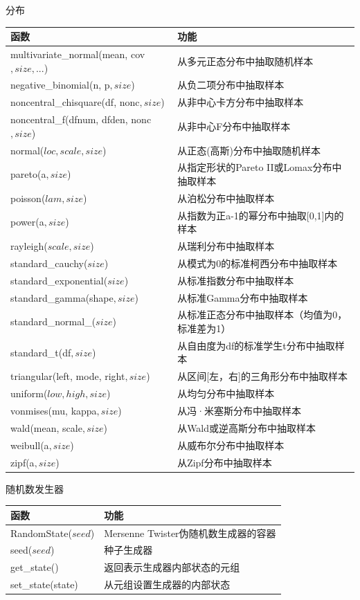 \documentclass[ignorenonframetext,11pt,xcolor=dvipsnames,hyperref={colorlinks,allcolors=.,urlcolor=blue, citecolor=violet, bookmarksdepth=4},aspectratio=1610]{beamer}
\begin{document}
\begin{frame}{分布}
\protect\hypertarget{section-38}{}

\scriptsize

\begin{longtable}[]{@{}ll@{}}
\toprule
函数 & 功能\tabularnewline
\midrule
\endhead
multivariate\_normal(mean, cov\(, size, ...\)) &
从多元正态分布中抽取随机样本\tabularnewline
negative\_binomial(n, p\(, size\)) &
从负二项分布中抽取样本\tabularnewline
noncentral\_chisquare(df, nonc\(, size\)) &
从非中心卡方分布中抽取样本\tabularnewline
noncentral\_f(dfnum, dfden, nonc\(, size\)) &
从非中心F分布中抽取样本\tabularnewline
normal(\(loc, scale, size\)) &
从正态(高斯)分布中抽取随机样本\tabularnewline
pareto(a\(, size\)) & 从指定形状的Pareto
II或Lomax分布中抽取样本\tabularnewline
poisson(\(lam, size\)) & 从泊松分布中抽取样本\tabularnewline
power(a\(, size\)) &
从指数为正a-1的幂分布中抽取{[}0,1{]}内的样本\tabularnewline
rayleigh(\(scale, size\)) & 从瑞利分布中抽取样本\tabularnewline
standard\_cauchy(\(size\)) &
从模式为0的标准柯西分布中抽取样本\tabularnewline
standard\_exponential(\(size\)) &
从标准指数分布中抽取样本\tabularnewline
standard\_gamma(shape\(, size\)) &
从标准Gamma分布中抽取样本\tabularnewline
standard\_normal\_(\(size\)) &
从标准正态分布中抽取样本（均值为0，标准差为1）\tabularnewline
standard\_t(df\(, size\)) &
从自由度为df的标准学生t分布中抽取样本\tabularnewline
triangular(left, mode, right\(, size\)) &
从区间{[}左，右{]}的三角形分布中抽取样本\tabularnewline
uniform(\(low, high, size\)) & 从均匀分布中抽取样本\tabularnewline
vonmises(mu, kappa\(, size\)) & 从冯·米塞斯分布中抽取样本\tabularnewline
wald(mean, scale\(, size\)) &
从Wald或逆高斯分布中抽取样本\tabularnewline
weibull(a\(, size\)) & 从威布尔分布中抽取样本\tabularnewline
zipf(a\(, size\)) & 从Zipf分布中抽取样本\tabularnewline
\bottomrule
\end{longtable}

\end{frame}

\begin{frame}{随机数发生器}
\protect\hypertarget{section-39}{}

\begin{longtable}[]{@{}ll@{}}
\toprule
函数 & 功能\tabularnewline
\midrule
\endhead
RandomState(\(seed\)) & Mersenne
Twister伪随机数生成器的容器\tabularnewline
seed(\(seed\)) & 种子生成器\tabularnewline
get\_state() & 返回表示生成器内部状态的元组\tabularnewline
set\_state(state) & 从元组设置生成器的内部状态\tabularnewline
\bottomrule
\end{longtable}

\end{frame}
\end{document}
